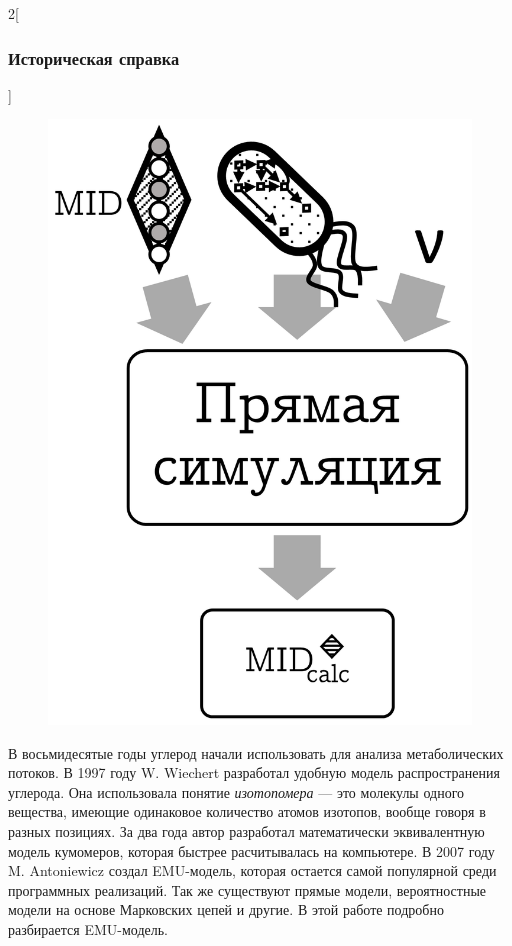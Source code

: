 \documentclass[14pt, a4paper]{extreport}
\begin{document}
\begin{multicols}{2}[\subsubsection{Историческая справка}]
	\begin{figure}[H]
		\includegraphics[width=0.9\linewidth]{direct_simulation.png}
		\label{direct_simulation}
	\end{figure}
	
	В восьмидесятые годы углерод начали использовать для анализа метаболических потоков. В 1997 году	
	W. Wiechert разработал удобную модель распространения углерода. Она использовала понятие \emph{изотопомера} --- это молекулы одного вещества, имеющие одинаковое количество атомов изотопов, вообще говоря в разных позициях. За два года автор разработал математически эквивалентную модель кумомеров, которая быстрее расчитывалась на компьютере. В 2007 году M. Antoniewicz создал EMU-модель, которая остается самой популярной среди программных реализаций. Так же существуют прямые модели\cite{Direct_MFA}, вероятностные модели на основе Марковских цепей\cite{Markov_chain_MFA} и другие\cite{Fluxomer_MFA}. В этой работе подробно разбирается EMU-модель.
\end{multicols}
\end{document}
